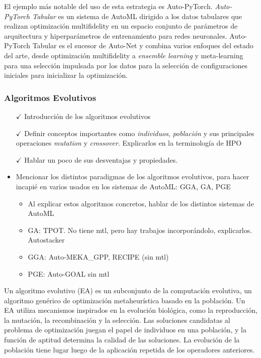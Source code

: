 El ejemplo más notable del uso de esta estrategia es Auto-PyTorch. \textit{Auto-PyTorch Tabular} es un sistema de AutoML dirigido a los datos tabulares que realizan optimización  multifidelity en un espacio conjunto de parámetros de arquitectura y hiperparámetros de entrenamiento para redes neuronales. Auto-PyTorch Tabular es el sucesor de Auto-Net y combina varios enfoques del estado del arte, desde optimización multifidelity a \textit{ensemble learning} y meta-learning para una selección impulsada por los datos para la selección de configuraciones iniciales para inicializar la optimización.

\subsubsection{Algoritmos Evolutivos}


\begin{itemize}
	\item[$\checkmark$] Introducción de los algoritmos evolutivos
	\item[$\checkmark$] Definir conceptos importantes como \textit{individuos}, \textit{población} y sus principales operaciones \textit{mutation} y \textit{crossover}. Explicarlos en la terminología de HPO
	\item[$\checkmark$] Hablar un poco de sus desventajas y propiedades.
	\item Mencionar los distintos paradigmas de los algoritmos evolutivos, para hacer incapié en varios usados en los sistemas de AutoML: GGA, GA, PGE
	\begin{itemize}
	\item Al explicar estos algoritmos concretos, hablar de los distintos sistemas de AutoML
	\item GA: TPOT. No tiene mtl, pero hay trabajos incorporándolo, explicarlos. Autostacker
	\item GGA: Auto-MEKA\_GPP, RECIPE (sin mtl)
	\item PGE: Auto-GOAL sin mtl
	\end{itemize}
\end{itemize}

Un algoritmo evolutivo (EA) es un subconjunto de la computación evolutiva, un algoritmo genérico de optimización metaheurística basado en la población. Un EA utiliza mecanismos inspirados en la evolución biológica, como la reproducción, la mutación, la recombinación y la selección. Las soluciones candidatas al problema de optimización juegan el papel de individuos en una población, y la función de aptitud determina la calidad de las soluciones. La evolución de la población tiene lugar luego de la aplicación repetida de los operadores anteriores.

